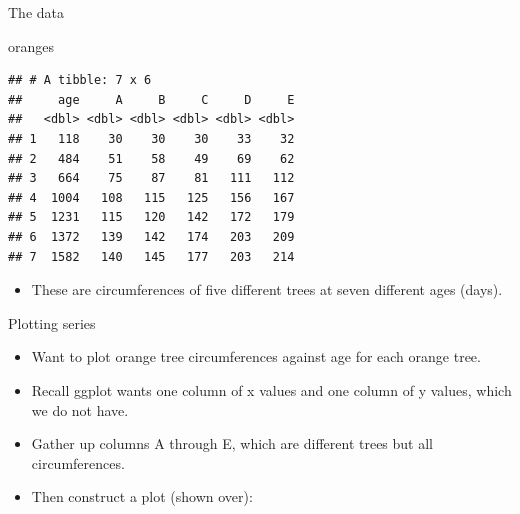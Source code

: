 \documentclass[
  ignorenonframetext,
]{beamer}
\newenvironment{Shaded}{\begin{snugshade}}{\end{snugshade}}
\newcommand{\DataTypeTok}[1]{\textcolor[rgb]{0.13,0.29,0.53}{#1}}
\newcommand{\KeywordTok}[1]{\textcolor[rgb]{0.13,0.29,0.53}{\textbf{#1}}}
\newcommand{\NormalTok}[1]{#1}
\newcommand{\OperatorTok}[1]{\textcolor[rgb]{0.81,0.36,0.00}{\textbf{#1}}}
\newcommand{\StringTok}[1]{\textcolor[rgb]{0.31,0.60,0.02}{#1}}
\providecommand{\tightlist}{%
  \setlength{\itemsep}{0pt}\setlength{\parskip}{0pt}}
\begin{document}
\begin{frame}[fragile]{The data}
\protect\hypertarget{the-data-6}{}

\begin{Shaded}
\begin{Highlighting}[]
\NormalTok{oranges}
\end{Highlighting}
\end{Shaded}

\begin{verbatim}
## # A tibble: 7 x 6
##     age     A     B     C     D     E
##   <dbl> <dbl> <dbl> <dbl> <dbl> <dbl>
## 1   118    30    30    30    33    32
## 2   484    51    58    49    69    62
## 3   664    75    87    81   111   112
## 4  1004   108   115   125   156   167
## 5  1231   115   120   142   172   179
## 6  1372   139   142   174   203   209
## 7  1582   140   145   177   203   214
\end{verbatim}

\begin{itemize}
\tightlist
\item
  These are circumferences of five different trees at seven different
  ages (days).
\end{itemize}

\end{frame}

\begin{frame}[fragile]{Plotting series}
\protect\hypertarget{plotting-series}{}

\begin{itemize}
\item
  Want to plot orange tree circumferences against age for each orange
  tree.
\item
  Recall ggplot wants one column of x values and one column of y values,
  which we do not have.
\item
  Gather up columns A through E, which are different trees but all
  circumferences.
\item
  Then construct a plot (shown over):
\end{itemize}

\begin{Shaded}
\end{Shaded}

\end{frame}
\end{document}
